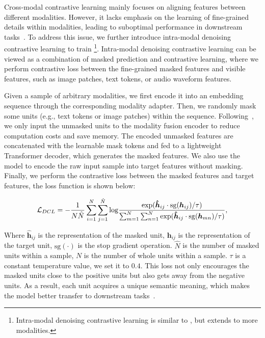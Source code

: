 Cross-modal contrastive learning mainly focuses on aligning features between different modalities. 
However, it lacks emphasis on the learning of fine-grained details within modalities, leading to suboptimal performance in downstream tasks~\cite{fd-clip}. 
To address this issue, we further introduce intra-modal denoising contrastive learning to train \onepeace\footnote{Intra-modal denoising contrastive learning is similar to \cite{conmim}, but extends to more modalities.}.
Intra-modal denoising contrastive learning can be viewed as a combination of masked prediction and contrastive learning, where we perform contrastive loss between the fine-grained masked features and visible features, such as image patches, text tokens, or audio waveform features.

Given a sample of arbitrary modalities, we first encode it into an embedding sequence through the corresponding modality adapter.
Then, we randomly mask some units (e.g., text tokens or image patches) within the sequence.
Following~\cite{mae}, we only input the unmasked units to the modality fusion encoder to reduce computation costs and save memory.
The encoded unmasked features are concatenated with the learnable mask tokens and fed to a lightweight Transformer decoder, which generates the masked features.
We also use the \onepeace model to encode the raw input sample into target features without masking.
Finally, we perform the contrastive loss between the masked features and target features, the loss function is shown below:

\begin{equation}
\label{eq:mcl}
\mathcal{L}_{DCL} = -\frac{1}{N\hat{N}}\sum_{i=1}^{N}\sum_{j=1}^{\hat{N}}{\rm log}\frac{{\rm exp}(\bm{\hat{h}}_{ij} \cdot {\rm sg}(\bm{h}_{ij})/\tau)}{\sum_{m=1}^{N}\sum_{n=1}^{N}{\rm exp}(\bm{\hat{h}}_{ij}  \cdot {\rm sg}(\bm{h}_{mn})/\tau)},
\end{equation}

Where $\bm{\hat{h}}_{ij}$ is the representation of the masked unit, $\bm{h}_{ij}$ is the representation of the target unit, $\text{sg}(\cdot)$ is the stop gradient operation. $\hat{N}$ is the number of masked units within a sample, $N$ is the number of whole units within a sample. $\tau$ is a constant temperature value, we set it to $0.4$. 
This loss not only encourages the masked units close to the positive units but also gets away from the negative units.
As a result, each unit acquires a unique semantic meaning, which makes the model better transfer to downstream tasks~\cite{fd-clip}.

